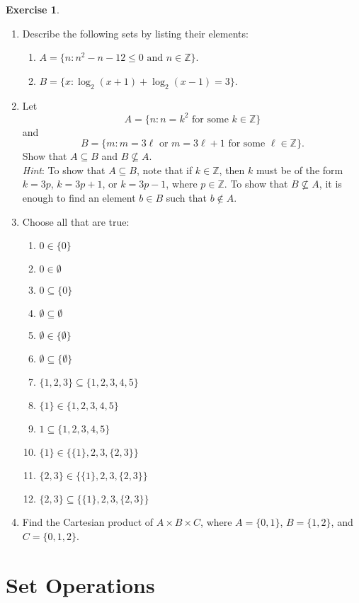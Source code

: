 \documentclass[12pt,letterpaper]{book}
\numberwithin{equation}{section}
\theoremstyle{definition}
\newtheorem{exercise}{\textbf{Exercise}}[chapter]
\begin{document}
\begin{exercise}\quad
\begin{enumerate}[\bfseries 1.]
\item Describe the following sets by listing their elements:
\begin{enumerate}
\item $A=\{n: n^2-n-12\leq 0 \text{ and } n\in \mathbb{Z}\}$.
\item $B=\{x: \log_2(x+1)+\log_2(x-1)=3\}$.
\end{enumerate}

\item Let $$A=\{n: n=k^2 \text{ for some }k\in \mathbb{Z}\}$$ and $$B=\{m: m=3\ell \text{ or }m=3\ell+1 \text{ for some }\ell\in \mathbb{Z}\}.$$ Show that $A\subseteq B$ and $B\nsubseteq A$.\\
    \textit{Hint}: To show that $A\subseteq B$, note that if $k\in \mathbb{Z}$, then $k$ must be of the form $k=3p$, $k=3p+1$, or $k=3p-1$, where $p\in \mathbb{Z}$. To show that $B\nsubseteq A$, it is enough to find an element $b\in B$ such that $b\notin A$.

\item Choose all that are true:
\begin{enumerate}
\item $0\in \{0\}$
\item $0\in \emptyset$
\item $0\subseteq \{0\}$
\item $\emptyset\subseteq \emptyset$
\item $\emptyset\in \{\emptyset\}$
\item $\emptyset\subseteq \{\emptyset\}$
\item $\{1,2,3\}\subseteq \{1,2,3,4,5\}$
\item $\{1\}\in \{1,2,3,4,5\}$
\item $1\subseteq \{1,2,3,4,5\}$
\item $\{1\}\in \{\{1\},2,3,\{2,3\}\}$
\item $\{2,3\}\in \{\{1\},2,3,\{2,3\}\}$
\item $\{2,3\}\subseteq \{\{1\},2,3,\{2,3\}\}$
\end{enumerate}

\item Find the Cartesian product of $A\times B\times C$, where $A=\{0,1\}$, $B=\{1,2\}$, and $C=\{0,1,2\}$.
\end{enumerate}
\end{exercise}

\section{Set Operations}
\end{document}
